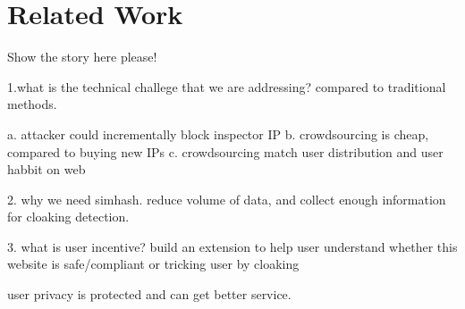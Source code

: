 \section{Related Work}

Show the story here please!

1.what is the technical challege that we are addressing? compared to traditional
methods.

a. attacker could incrementally block inspector IP
b. crowdsourcing is cheap, compared to buying new IPs
c. crowdsourcing match user distribution and user habbit on web
~\cite{wang2011cloak}

2. why we need simhash.
reduce volume of data, and collect enough information for cloaking detection.


3. what is user incentive?
build an extension to help user understand whether this website is
safe/compliant or tricking user by cloaking

user privacy is protected and can get better service.


